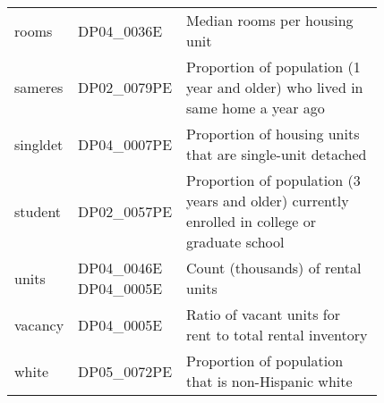 \begin{tabular}{l p{0.15\linewidth} p{0.675\linewidth}}
rooms    & DP04\_0036E  & Median rooms per housing unit\\
sameres  & DP02\_0079PE & Proportion of population (1 year and older) who lived in same home a year ago\\
singldet & DP04\_0007PE & Proportion of housing units that are single-unit detached\\
student  & DP02\_0057PE & Proportion of population (3 years and older) currently enrolled in college or graduate school\\
units    & DP04\_0046E DP04\_0005E & Count (thousands) of rental units\\
vacancy  & DP04\_0005E  & Ratio of vacant units for rent to total rental inventory\\
white    & DP05\_0072PE & Proportion of population that is non-Hispanic white\\
\bottomrule
\end{tabular}
